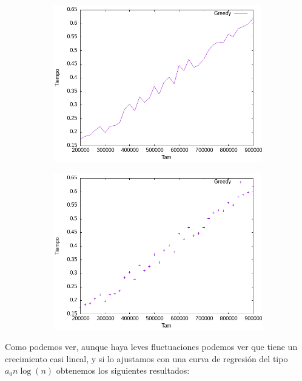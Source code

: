 \documentclass{article}
\begin{document}
   \begin{figure}[H]
    \begin{subfigure}{0.4\textwidth}
        \centering
        \includegraphics[scale = 0.40]{Problema1/Imagenes/GraficaLineas.jpeg}
    \end{subfigure} \hfill
    \begin{subfigure}{0.4\textwidth}
        \centering
        \includegraphics[scale = 0.40]{Problema1/Imagenes/GraficaPuntos.jpeg}
    \end{subfigure}
    \end{figure}

    Como podemos ver, aunque haya leves fluctuaciones podemos ver que tiene un crecimiento casi lineal, y si lo ajustamos con una curva de 
    regresión del tipo $a_0 n \log (n)$ obtenemos los siguientes resultados: 
\end{document}
